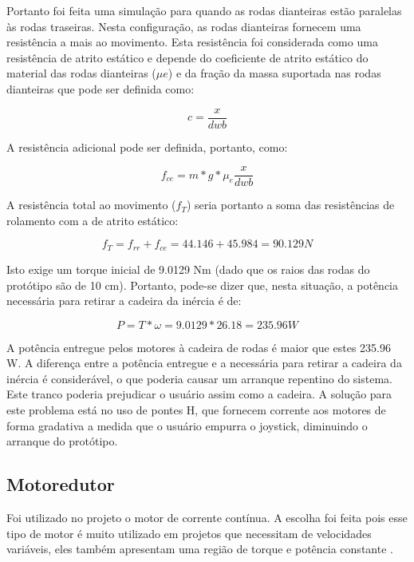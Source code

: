 Portanto foi feita uma simulação para quando as rodas dianteiras estão paralelas às rodas traseiras. Nesta configuração, as rodas dianteiras fornecem uma resistência a mais ao movimento. Esta resistência foi considerada como uma resistência de atrito estático e depende do coeficiente de atrito estático do material das rodas dianteiras ($\mu e$) e da fração da massa suportada nas rodas dianteiras que pode ser definida como:

\begin{equation}
c = \frac{x}{dwb}
\end{equation}

A resistência adicional pode ser definida, portanto, como:

\begin{equation}
f_{ce}= m*g* \mu_e \frac{x}{dwb}
\end{equation}

A resistência total ao movimento ($f_T$) seria portanto a soma das resistências de rolamento com a de atrito estático:

\begin{equation}
f_T = f_{rr} + f_{ce} = 44.146+45.984 = 90.129 N
\end{equation}

Isto exige um torque inicial de 9.0129 Nm (dado que os raios das rodas do protótipo são de 10 cm). Portanto, pode-se dizer que, nesta situação, a potência necessária para retirar a cadeira da inércia é de:

\begin{equation}
P = T*\omega = 9.0129*26.18 = 235.96 W
\end{equation}

	A potência entregue pelos motores à cadeira de rodas é maior que estes 235.96 W. A diferença entre a potência entregue e a necessária para retirar a cadeira da inércia é considerável, o que poderia causar um arranque repentino do sistema. Este tranco poderia prejudicar o usuário assim como a cadeira. A solução para este problema está no uso de pontes H, que fornecem corrente aos motores de forma gradativa a medida que o usuário empurra o joystick, diminuindo o arranque do protótipo.

  \subsection{Motoredutor}

  Foi utilizado no projeto o motor de corrente contínua. A escolha foi feita pois esse tipo de motor é muito utilizado em projetos que necessitam de velocidades variáveis, eles também apresentam uma região de torque e potência constante \cite{manual_bateria_unipower}.


